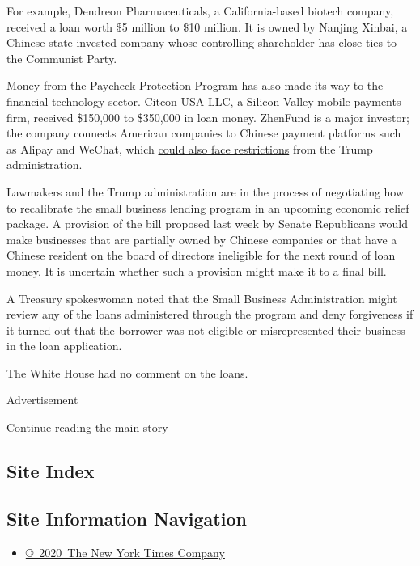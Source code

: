 For example, Dendreon Pharmaceuticals, a California-based biotech
company, received a loan worth \$5 million to \$10 million. It is owned
by Nanjing Xinbai, a Chinese state-invested company whose controlling
shareholder has close ties to the Communist Party.

Money from the Paycheck Protection Program has also made its way to the
financial technology sector. Citcon USA LLC, a Silicon Valley mobile
payments firm, received \$150,000 to \$350,000 in loan money. ZhenFund
is a major investor; the company connects American companies to Chinese
payment platforms such as Alipay and WeChat, which
\href{https://www.nytimes3xbfgragh.onion/2020/07/15/technology/tiktok-washington-lobbyist.html}{could
also face restrictions} from the Trump administration.

Lawmakers and the Trump administration are in the process of negotiating
how to recalibrate the small business lending program in an upcoming
economic relief package. A provision of the bill proposed last week by
Senate Republicans would make businesses that are partially owned by
Chinese companies or that have a Chinese resident on the board of
directors ineligible for the next round of loan money. It is uncertain
whether such a provision might make it to a final bill.

A Treasury spokeswoman noted that the Small Business Administration
might review any of the loans administered through the program and deny
forgiveness if it turned out that the borrower was not eligible or
misrepresented their business in the loan application.

The White House had no comment on the loans.

Advertisement

\protect\hyperlink{after-bottom}{Continue reading the main story}

\hypertarget{site-index}{%
\subsection{Site Index}\label{site-index}}

\hypertarget{site-information-navigation}{%
\subsection{Site Information
Navigation}\label{site-information-navigation}}

\begin{itemize}
\tightlist
\item
  \href{https://help.nytimes3xbfgragh.onion/hc/en-us/articles/115014792127-Copyright-notice}{©~2020~The
  New York Times Company}
\end{itemize}

